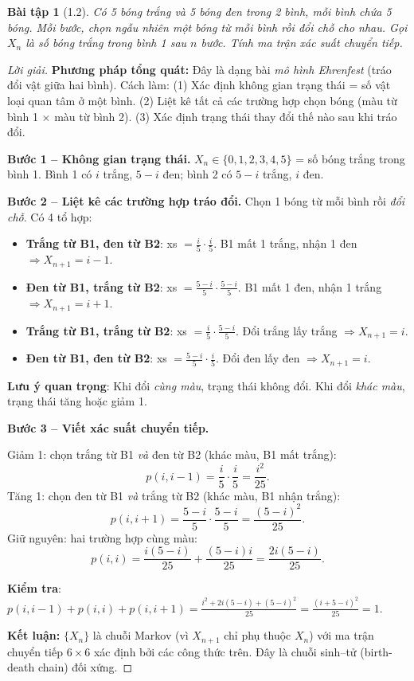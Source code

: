 \documentclass[8pt,a4paper]{article}
\newtheorem{exercise}{Bài tập}
\newenvironment{solution}{\begin{proof}[Lời giải]}{\end{proof}}
\begin{document}
\begin{exercise}[1.2]
Có 5 bóng trắng và 5 bóng đen trong 2 bình, mỗi bình chứa 5 bóng. Mỗi bước, chọn ngẫu nhiên một bóng từ mỗi bình rồi đổi chỗ cho nhau. Gọi $X_n$ là số bóng trắng trong bình 1 sau $n$ bước. Tính ma trận xác suất chuyển tiếp.
\end{exercise}
\begin{solution}
\textbf{Phương pháp tổng quát:} Đây là dạng bài \emph{mô hình Ehrenfest} (tráo đổi vật giữa hai bình). Cách làm: (1) Xác định không gian trạng thái = số vật loại quan tâm ở một bình. (2) Liệt kê tất cả các trường hợp chọn bóng (màu từ bình 1 $\times$ màu từ bình 2). (3) Xác định trạng thái thay đổi thế nào sau khi tráo đổi.

\textbf{Bước 1 -- Không gian trạng thái.}
$X_n \in \{0, 1, 2, 3, 4, 5\}$ = số bóng trắng trong bình 1. Bình 1 có $i$ trắng, $5-i$ đen; bình 2 có $5-i$ trắng, $i$ đen.

\textbf{Bước 2 -- Liệt kê các trường hợp tráo đổi.}
Chọn 1 bóng từ mỗi bình rồi \emph{đổi chỗ}. Có 4 tổ hợp:
\begin{itemize}
  \item \textbf{Trắng từ B1, đen từ B2}: xs $= \frac{i}{5}\cdot\frac{i}{5}$. B1 mất 1 trắng, nhận 1 đen $\Rightarrow X_{n+1} = i - 1$.
  \item \textbf{Đen từ B1, trắng từ B2}: xs $= \frac{5-i}{5}\cdot\frac{5-i}{5}$. B1 mất 1 đen, nhận 1 trắng $\Rightarrow X_{n+1} = i + 1$.
  \item \textbf{Trắng từ B1, trắng từ B2}: xs $= \frac{i}{5}\cdot\frac{5-i}{5}$. Đổi trắng lấy trắng $\Rightarrow X_{n+1} = i$.
  \item \textbf{Đen từ B1, đen từ B2}: xs $= \frac{5-i}{5}\cdot\frac{i}{5}$. Đổi đen lấy đen $\Rightarrow X_{n+1} = i$.
\end{itemize}

\textbf{Lưu ý quan trọng}: Khi đổi \emph{cùng màu}, trạng thái không đổi. Khi đổi \emph{khác màu}, trạng thái tăng hoặc giảm 1.

\textbf{Bước 3 -- Viết xác suất chuyển tiếp.}

Giảm 1: chọn trắng từ B1 \emph{và} đen từ B2 (khác màu, B1 mất trắng):
\[
  p(i, i-1) = \frac{i}{5}\cdot\frac{i}{5} = \frac{i^2}{25}.
\]
Tăng 1: chọn đen từ B1 \emph{và} trắng từ B2 (khác màu, B1 nhận trắng):
\[
  p(i, i+1) = \frac{5-i}{5}\cdot\frac{5-i}{5} = \frac{(5-i)^2}{25}.
\]
Giữ nguyên: hai trường hợp cùng màu:
\[
  p(i, i) = \frac{i(5-i)}{25} + \frac{(5-i)i}{25} = \frac{2i(5-i)}{25}.
\]

\textbf{Kiểm tra}: $p(i,i-1) + p(i,i) + p(i,i+1) = \frac{i^2 + 2i(5-i) + (5-i)^2}{25} = \frac{(i+5-i)^2}{25} = 1$. \checkmark

\textbf{Kết luận:} $\{X_n\}$ là chuỗi Markov (vì $X_{n+1}$ chỉ phụ thuộc $X_n$) với ma trận chuyển tiếp $6\times 6$ xác định bởi các công thức trên. Đây là chuỗi sinh--tử (birth-death chain) đối xứng.
\end{solution}
\end{document}
